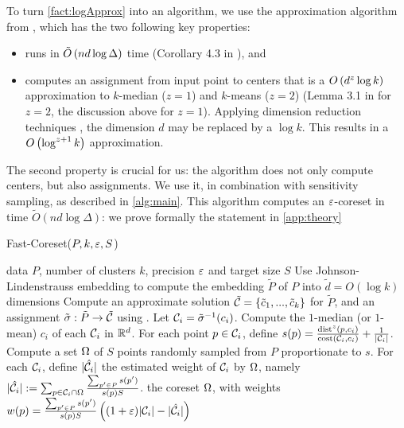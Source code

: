 To turn \cref{fact:logApprox} into an algorithm, we use the \fkmeans approximation algorithm from \cite{cohen2020fast}, which has the two following key properties: 
\begin{itemize}
\item \fkmeans runs in $\tilde O\left( n d \log \Delta\right)$ time (Corollary 4.3 in \cite{cohen2020fast}), and
\item \fkmeans computes an assignment from input point to centers that is a $O\left( d^z \log k\right)$ approximation to $k$-median ($z=1$) and
$k$-means ($z=2$) (Lemma 3.1 in \cite{cohen2020fast} for $z=2$, the discussion above for $z=1$). Applying dimension reduction techniques \cite{MakarychevMR19}, the dimension $d$ may be replaced by a $\log k$. This results in a $O\left(\log^{z+1} k\right)$ approximation.
\end{itemize}

The second property is crucial for us: the algorithm does not only compute centers, but also assignments. 
  We use it, in combination with sensitivity sampling, as described in \cref{alg:main}.
This algorithm computes an $\varepsilon$-coreset in time $\tilde O(nd \log \Delta)$: we prove formally the statement in \cref{app:theory}

\begin{algorithm}[tb]
   \caption{Fast-Coreset($P, k, \varepsilon, S$)}
   \label{alg:main}
\begin{algorithmic}[1]
    data $P$, number of clusters $k$, precision $\varepsilon$ and target size $S$
   \State Use Johnson-Lindenstrauss embedding to compute the embedding $\tilde P$ of $P$ into $\tilde d = O(\log k)$ dimensions
   \State Compute an approximate solution $\tilde {\mathcal C} = \left\{ \tilde c_1, ..., \tilde c_k\right\} $ for $\tilde P$, and an assignment $\tilde \sigma : \tilde P \rightarrow \tilde {\mathcal C}$ using \fkmeans.	
   \State Let $\mathcal C_i = \tilde \sigma^{-1}(c_i)$. Compute the $1$-median (or $1$-mean) $c_i$ of each $\mathcal C_i$ in $\mathbb{R}^d$.%
   \State For each point $p \in \mathcal C_i$, define
   $s(p) = \frac{\operatorname{dist}^z(p, c_i)}{\operatorname{cost}(\mathcal C_i, c_i)}+ \frac{1}{|\mathcal C_i|}$.
   \State Compute a set $\Omega$ of $S$ points randomly sampled from $P$ proportionate to $s$.
   \State For each $\mathcal C_i$, define $|\hat {\mathcal C}_i|$ the estimated weight of $\mathcal C_i$ by $\Omega$, namely $|\hat {\mathcal C}_i| := \sum_{p \in \mathcal C_i \cap \Omega} \frac{\sum_{p' \in P}s(p')}{s(p)S}$.
    the coreset $\Omega$, with weights $w(p) = \frac{\sum_{p' \in P}s(p')}{s(p)S} \left( (1+\varepsilon)|\mathcal C_i| - |\hat {\mathcal C}_i|\right)$
\end{algorithmic}
\end{algorithm}


